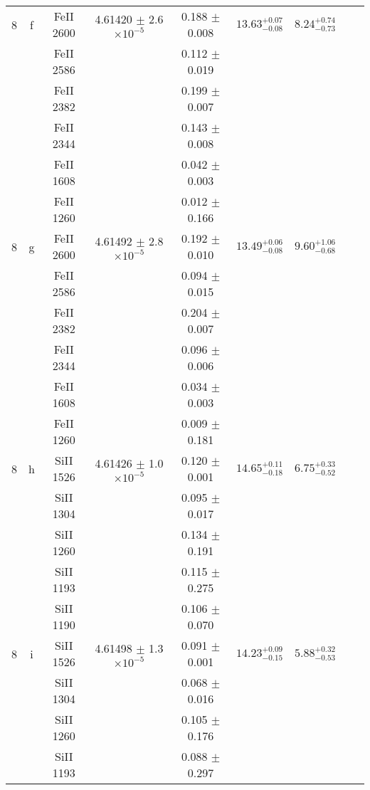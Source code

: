 \documentclass[12pt]{article}
\begin{document}
\begin{footnotesize}
\begin{longtable}{ c c c c c c c c c}
       8  & f  & FeII     2600  &  4.61420 $\pm$ 2.6 $\times 10^{-5}$   &  0.188 $\pm$ 0.008   & $13.63_{ - 0.08}^{ + 0.07}$  & $8.24_{ - 0.73}^{ + 0.74}$    & 	 & \\ 
  &   & FeII     2586  &  &  0.112 $\pm$ 0.019   &   &     & 	 & \\ 
  &   & FeII     2382  &  &  0.199 $\pm$ 0.007   &   &     & 	 & \\ 
  &   & FeII     2344  &  &  0.143 $\pm$ 0.008   &   &     & 	 & \\ 
  &   & FeII     1608  &  &  0.042 $\pm$ 0.003   &   &     & 	 & \\ 
  &   & FeII     1260  &  &  0.012 $\pm$ 0.166   &   &     & 	 & \\ 
       8  & g  & FeII     2600  &  4.61492 $\pm$ 2.8 $\times 10^{-5}$   &  0.192 $\pm$ 0.010   & $13.49_{ - 0.08}^{ + 0.06}$  & $9.60_{ - 0.68}^{ + 1.06}$    & 	 & \\ 
  &   & FeII     2586  &  &  0.094 $\pm$ 0.015   &   &     & 	 & \\ 
  &   & FeII     2382  &  &  0.204 $\pm$ 0.007   &   &     & 	 & \\ 
  &   & FeII     2344  &  &  0.096 $\pm$ 0.006   &   &     & 	 & \\ 
  &   & FeII     1608  &  &  0.034 $\pm$ 0.003   &   &     & 	 & \\ 
  &   & FeII     1260  &  &  0.009 $\pm$ 0.181   &   &     & 	 & \\ 
       8  & h  & SiII     1526  &  4.61426 $\pm$ 1.0 $\times 10^{-5}$   &  0.120 $\pm$ 0.001   & $14.65_{ - 0.18}^{ + 0.11}$  & $6.75_{ - 0.52}^{ + 0.33}$    & 	 & \\ 
  &   & SiII     1304  &  &  0.095 $\pm$ 0.017   &   &     & 	 & \\ 
  &   & SiII     1260  &  &  0.134 $\pm$ 0.191   &   &     & 	 & \\ 
  &   & SiII     1193  &  &  0.115 $\pm$ 0.275   &   &     & 	 & \\ 
  &   & SiII     1190  &  &  0.106 $\pm$ 0.070   &   &     & 	 & \\ 
       8  & i  & SiII     1526  &  4.61498 $\pm$ 1.3 $\times 10^{-5}$   &  0.091 $\pm$ 0.001   & $14.23_{ - 0.15}^{ + 0.09}$  & $5.88_{ - 0.53}^{ + 0.32}$    & 	 & \\ 
  &   & SiII     1304  &  &  0.068 $\pm$ 0.016   &   &     & 	 & \\ 
  &   & SiII     1260  &  &  0.105 $\pm$ 0.176   &   &     & 	 & \\ 
  &   & SiII     1193  &  &  0.088 $\pm$ 0.297   &   &     & 	 & \\ 

\end{longtable}
\end{footnotesize}
\end{document}
